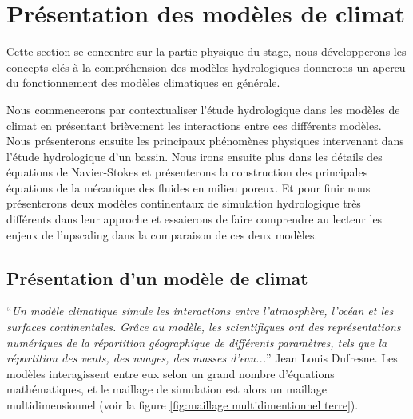 \documentclass[a4paper,11pt]{article}
\numberwithin{equation}{section}
\begin{document}
\newpage
\section{Présentation des modèles de climat }
\label{ch:presentation modele climat}

Cette section se concentre sur la partie physique du stage, nous développerons les concepts clés à la compréhension des modèles hydrologiques donnerons un apercu du fonctionnement des modèles climatiques en générale. 

\vspace{0.7cm}

Nous commencerons par contextualiser l'étude hydrologique dans les modèles de climat en présentant brièvement les interactions entre ces différents modèles. Nous présenterons ensuite les principaux phénomènes physiques intervenant dans l'étude hydrologique d'un bassin. Nous irons ensuite plus dans les détails des équations de Navier-Stokes et présenterons la construction des principales équations de la mécanique des fluides en milieu poreux. Et pour finir nous présenterons deux modèles continentaux de simulation hydrologique très différents dans leur approche et essaierons de faire comprendre au lecteur les enjeux de l'upscaling dans la comparaison de ces deux modèles.

\subsection{Présentation d'un modèle de climat}
\label{modeles de climat/ concepts hydro}

``\textit{Un modèle climatique simule les interactions entre l'atmosphère, l'océan et les surfaces continentales. Grâce au modèle, les scientifiques ont des représentations numériques de la répartition géographique de différents paramètres, tels que la répartition des vents, des nuages, des masses d'eau...}'' Jean Louis Dufresne. Les modèles interagissent entre eux selon un grand nombre d'équations mathématiques, et le maillage de simulation est alors un maillage multidimensionnel (voir la figure \ref{fig:maillage multidimentionnel terre}). 
\end{document}
